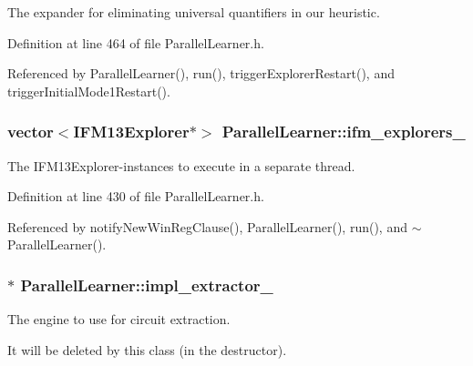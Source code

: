 The expander for eliminating universal quantifiers in our heuristic. 



Definition at line 464 of file Parallel\-Learner.\-h.



Referenced by Parallel\-Learner(), run(), trigger\-Explorer\-Restart(), and trigger\-Initial\-Mode1\-Restart().

\hypertarget{classParallelLearner_a614707a21f36d75a9fd06be57ee421d0}{
\subsubsection[{ifm\-\_\-explorers\-\_\-}]{\setlength{\rightskip}{0pt plus 5cm}vector$<${\bf I\-F\-M13\-Explorer}$\ast$$>$ Parallel\-Learner\-::ifm\-\_\-explorers\-\_\-\hspace{0.3cm}{\ttfamily [protected]}}}\label{classParallelLearner_a614707a21f36d75a9fd06be57ee421d0}


The I\-F\-M13\-Explorer-\/instances to execute in a separate thread. 



Definition at line 430 of file Parallel\-Learner.\-h.



Referenced by notify\-New\-Win\-Reg\-Clause(), Parallel\-Learner(), run(), and $\sim$\-Parallel\-Learner().

\hypertarget{classParallelLearner_a58b6113b54eb7c91bbf15546d575f5e8}{
\subsubsection[{impl\-\_\-extractor\-\_\-}]{$\ast$ Parallel\-Learner\-::impl\-\_\-extractor\-\_\-\hspace{0.3cm}{\ttfamily [protected]}}}\label{classParallelLearner_a58b6113b54eb7c91bbf15546d575f5e8}


The engine to use for circuit extraction. 

It will be deleted by this class (in the destructor). 

